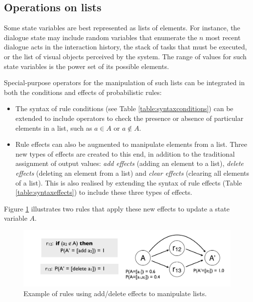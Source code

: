 \subsection{Operations on lists}

Some state variables are best represented as lists of elements. For instance, the dialogue state may include random variables that enumerate  the $n$ most recent dialogue acts in the interaction history, the stack of tasks that must be executed, or the list of visual objects perceived by the system.  The range of values for such state variables is the power set of its possible elements. 

Special-purpose operators for the manipulation of such lists can be integrated in both the conditions and effects of probabilistic rules: 
\begin{itemize}
\item The syntax of rule conditions (see Table \ref{table:syntaxconditions}) can be extended to include operators to check the presence or absence of particular elements in a list, such as $a \in A$ or $a \notin A$. 
\item Rule effects can also be augmented to manipulate elements from a list.  Three new types of effects are created to this end, in addition to the traditional assignment of output values: \textit{add effects} (adding an element to a list), \textit{delete effects} (deleting an element from a list) and \textit{clear effects} (clearing all elements of a list). This is also realised by extending the syntax of rule effects (Table \ref{table:syntaxeffects}) to include these three types of effects. 
\end{itemize}

Figure \ref{fig:seteffects} illustrates two rules that apply these new effects to update a state variable $A$. 
 
\begin{figure}[ht]
\centering
\includegraphics[scale=0.25]{imgs/seteffects.pdf}
\caption{Example of rules using add/delete effects to manipulate lists.}
\label{fig:seteffects}
\end{figure}

